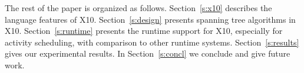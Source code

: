  The rest of the paper is organized as follows. Section~\ref{s:x10} describes the language features of X10. Section~\ref{s:design} presents spanning tree algorithms in X10. Section~\ref{s:runtime} presents the runtime support for X10, especially for activity scheduling, with comparison to other runtime systems. 
 Section~\ref{s:results} gives our experimental results. In Section~\ref{s:concl} we conclude and give future work. 
  


